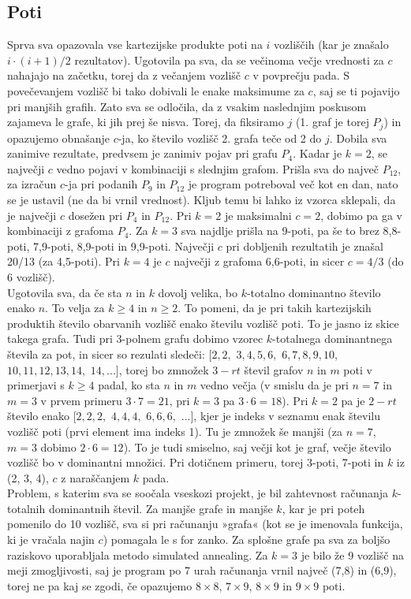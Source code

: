 \documentclass[12pt, a4paper]{article}
\begin{document}
\subsection{Poti}
Sprva sva opazovala vse kartezijske produkte poti na $i$ vozliščih (kar je znašalo $i\cdot(i+1)/2$ rezultatov). Ugotovila pa sva, da se večinoma večje vrednosti za $c$ nahajajo na začetku, torej da z večanjem vozlišč $c$ v povprečju pada. S povečevanjem vozlišč bi tako dobivali le enake maksimume za $c$, saj se ti pojavijo pri manjših grafih. Zato sva se odločila, da z vsakim naslednjim poskusom zajameva le grafe, ki jih prej še nisva. Torej, da fiksiramo $j$ (1. graf je torej $P_j$) in opazujemo obnašanje $c$-ja, ko število vozlišč 2. grafa teče od 2 do $j$. Dobila sva zanimive rezultate, predvsem je zanimiv pojav pri grafu $P_4$. Kadar je $k=2$, se največji $c$ vedno pojavi v kombinaciji s slednjim grafom. Prišla sva do največ $P_{12}$, za izračun $c$-ja pri podanih $P_9$ in $P_{12}$ je program potreboval več kot en dan, nato se je ustavil (ne da bi vrnil vrednost). Kljub temu bi lahko iz vzorca sklepali, da je največji $c$ dosežen pri $P_4$ in $P_{12}$. Pri $k=2$ je maksimalni $c=2$, dobimo pa ga v kombinaciji z grafoma $P_4$. Za $k=3$ sva najdlje prišla na 9-poti, pa še to brez 8,8-poti, 7,9-poti, 8,9-poti in 9,9-poti. Največji $c$ pri dobljenih rezultatih je znašal 20/13 (za 4,5-poti). Pri $k=4$ je $c$ največji z grafoma 6,6-poti, in sicer $c=4/3$ (do 6 vozlišč). \\
Ugotovila sva, da če sta $n$ in $k$ dovolj velika, bo $k$-totalno dominantno število enako $n$. To velja za $k \geq 4$ in $n \geq 2$. To pomeni, da je pri takih kartezijskih produktih število obarvanih vozlišč enako številu vozlišč poti. To je jasno iz skice takega grafa. Tudi pri 3-polnem grafu dobimo vzorec $k$-totalnega dominantnega števila za pot, in sicer so rezulati sledeči: $[2,2,$ $3,4,5,6,$ $6,7,8,9,10,$ $10,11,12,13,14,$ $14, ...]$, torej bo zmnožek $3-rt$ števil grafov $n$ in $m$ poti v primerjavi s $k \geq 4$ padal, ko sta $n$ in $m$ vedno večja (v smislu da je pri $n=7$ in $m=3$ v prvem primeru $3 \cdot 7=21$, pri $k=3$ pa $3 \cdot 6=18$). Pri $k=2$ pa je $2-rt$ število enako $[2,2,2,$ $4,4,4,$ $6,6,6,$ $...]$, kjer je indeks v seznamu enak številu vozlišč poti (prvi element ima indeks 1). Tu je zmnožek še manjši (za $n=7$, $m=3$ dobimo $2 \cdot 6=12$). To je tudi smiselno, saj večji kot je graf, večje število vozlišč bo v dominantni množici. Pri dotičnem primeru, torej 3-poti, 7-poti in $k$ iz (2, 3, 4), $c$ z naraščanjem $k$ pada.\\
Problem, s katerim sva se soočala vseskozi projekt, je bil zahtevnost računanja $k$-totalnih dominantnih števil. Za manjše grafe in manjše $k$, kar je pri poteh pomenilo do 10 vozlišč, sva si pri računanju »grafa« (kot se je imenovala funkcija, ki je vračala najin $c$) pomagala le s for zanko. Za splošne grafe pa sva za boljšo raziskovo uporabljala metodo simulated annealing. Za $k=3$ je bilo že 9 vozlišč na meji zmogljivosti, saj je program po 7 urah računanja vrnil največ (7,8) in (6,9), torej ne pa kaj se zgodi, če opazujemo $8\times8$, $7\times9$, $8\times9$ in $9\times9$ poti. \\
\end{document}
